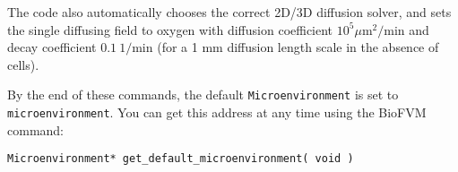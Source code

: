 \documentclass[12pt]{article}
\newcommand{\micron}{\mu\textrm{m}}
\renewcommand{\v}{\verb}
\begin{document}
The code also automatically chooses the correct 
2D/3D diffusion solver, and sets the single diffusing 
field to oxygen with diffusion coefficient 
$10^5 \micron^2/\textrm{min}$ and decay coefficient 
$0.1 \: 1/\textrm{min}$ (for a 1 mm diffusion length scale 
in the absence of cells). 

% 

By the end of these commands, the default \v|Microenvironment| is 
set to \v|microenvironment|. You can get this address at any time using 
the BioFVM command: 

\v|Microenvironment* get_default_microenvironment( void )|

% 
% 
\end{document}
